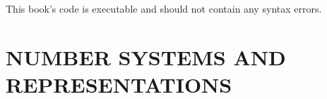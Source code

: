 \documentclass[11pt]{book}
\begin{document}
This book's code is executable and should not contain any syntax errors. 



\renewcommand*\contentsname{Contents (detailed)}
\setcounter{secnumdepth}{3}
\setcounter{tocdepth}{4}
\tableofcontents

\listoffigures

\listoftables

\lstlistoflistings



\mainmatter
{}

\setcounter{tocdepth}{3}%
\setcounter{secnumdepth}{3}
\etocsettocstyle{}{} %


\newtheorem{theorem}{Theorem}[chapter]
\newtheorem{exemplu}{Example}[chapter]
\newtheorem{definition}{Definition}[chapter]
\newtheorem{problem}{Problem}[chapter]
\newtheorem{project}{Project}[chapter]
\newtheorem{simulation}{VeriSim}[chapter]
\newtheorem{verisum}{SystemVerilogSummary}%
\newtheorem{corollary}{Corollary}[chapter]
\newtheorem{proof}{Proof}[chapter]


\part{NUMBER SYSTEMS AND REPRESENTATIONS}







\end{document}
